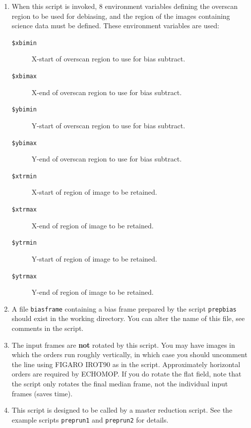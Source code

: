 \documentclass[twoside,11pt]{article}
\newcommand{\htmlref}[2]{#1}
\newcommand{\xref}[3]{#1}
\begin{document}
\begin{description}
\begin{enumerate}
\item When this script is invoked, 8 environment variables defining
      the overscan region to be used for debiasing, and the region
      of the images containing science data must be defined.
      These environment variables are used:

\begin{description}

\item [{\tt{\$xbimin}}]
           X-start of overscan region to use for bias subtract.

\item [{\tt{\$xbimax}}]
           X-end of overscan region to use for bias subtract.

\item [{\tt{\$ybimin}}]
           Y-start of overscan region to use for bias subtract.

\item [{\tt{\$ybimax}}]
           Y-end of overscan region to use for bias subtract.

\item [{\tt{\$xtrmin}}]
           X-start of region of image to be retained.

\item [{\tt{\$xtrmax}}]
           X-end of region of image to be retained.

\item [{\tt{\$ytrmin}}]
           Y-start of region of image to be retained.

\item [{\tt{\$ytrmax}}]
           Y-end of region of image to be retained.


\end{description}

\item A file \verb+biasframe+ containing a bias frame prepared by the
      script \htmlref{\texttt{prepbias}}{se_prepbias} should exist in the
      working directory.
      You can alter the name of this file, see comments in the
      script.

\item The input frames are {\bf not} rotated by this script.  You may
      have images in which the orders run roughly vertically,
      in which case you should uncomment the line using FIGARO
      \xref{IROT90}{sun86}{IROT90} as in the script.  Approximately
      horizontal orders
      are required by ECHOMOP.  If you do rotate the flat field,
      note that the script only rotates the final median frame,
      not the individual input frames (saves time).

\item This script is designed to be called by a master reduction
      script.  See the example scripts \htmlref{\texttt{preprun1}}
      {se_preprun}
      and \htmlref{\texttt{preprun2}}{se_preprun} for details.

\end{enumerate}
\end{description}
\end{document}
